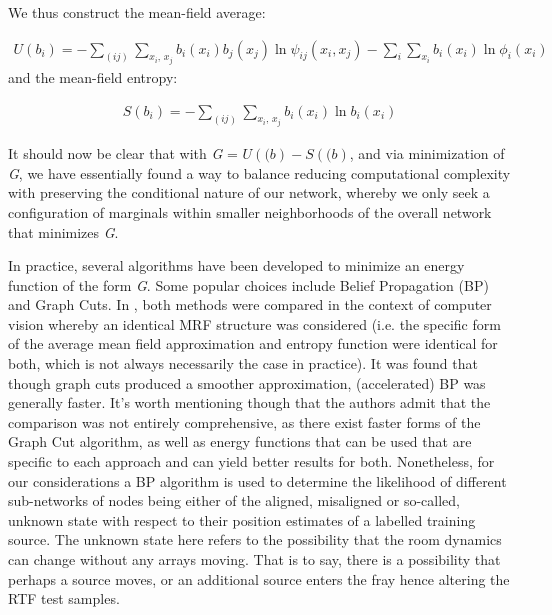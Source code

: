 \documentclass{article}
\begin{document}
We thus construct the mean-field average:

\begin{equation} \label{nearFieldApprox}
    \begin{aligned}
        \textit{U}\left(\textit{b$_i$}\right) = -\sum_{\left(\textit{{ij}}\right)}\sum_\textit{x$_i$, x$_j$}\textit{b$_i$}\left(\textit{x$_i$}\right)\textit{b$_j$}\left(\textit{x$_j$}\right)\ln\textit{$\psi_{ij}$}\left(\textit{x$_i$}, \textit{x$_j$} \right) - \sum_\textit{i}\sum_\textit{x$_i$}\textit{b$_i$}\left(\textit{x$_i$}\right)\ln\textit{$\phi_i$}\left(\textit{x$_i$}\right)
     \end{aligned}
\end{equation} and the mean-field entropy:

\begin{equation} \label{nearFieldApprox}
    \begin{aligned}
        \textit{S}\left(\textit{b$_i$}\right) = -\sum_{\left(\textit{{ij}}\right)}\sum_\textit{x$_i$, x$_j$}\textit{b$_i$}\left(\textit{x$_i$}\right)\ln\textit{b$_i$}\left(\textit{x$_i$}\right)
     \end{aligned}
\end{equation}

It should now be clear that with \textit{G} = $\textit{U}\left((\textit{b}\right) - \textit{S}\left((\textit{b}\right)$, and via minimization of \textit{G}, we have essentially found a way to balance reducing computational complexity with preserving the conditional nature of our network, whereby we only seek a configuration of marginals within smaller neighborhoods of the overall network that minimizes \textit{G}.

In practice, several algorithms have been developed to minimize an energy function of the form \textit{G}. Some popular choices include Belief Propagation (BP) and Graph Cuts. In \cite{MT_compareGraphCutsBeliefProp}, both methods were compared in the context of computer vision whereby an identical MRF structure was considered (i.e. the specific form of the average mean field approximation and entropy function were identical for both, which is not always necessarily the case in practice). It was found that though graph cuts produced a smoother approximation, (accelerated) BP was generally faster. It's worth mentioning though that the authors admit that the comparison was not entirely comprehensive, as there exist faster forms of the Graph Cut algorithm, as well as energy functions that can be used that are specific to each approach and can yield better results for both. Nonetheless, for our considerations a BP algorithm is used to determine the likelihood of different sub-networks of nodes being either of the aligned, misaligned or so-called, unknown state with respect to their position estimates of a labelled training source. The unknown state here refers to the possibility that the room dynamics can change without any arrays moving. That is to say, there is a possibility that perhaps a source moves, or an additional source enters the fray hence altering the RTF test samples.
\end{document}
